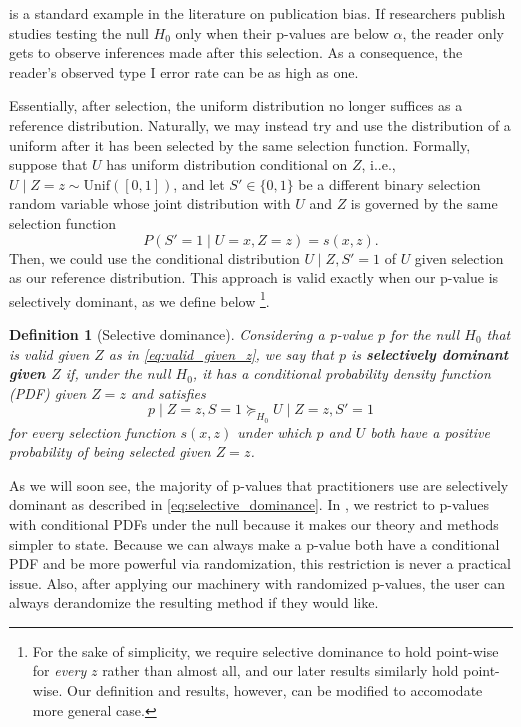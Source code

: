 \documentclass{article}
\newtheorem{definition}{Definition}
\begin{document}
 is a standard example in the literature on publication bias. If researchers publish studies testing the null $H_0$ only when their p-values are below $\alpha$, the reader only gets to observe inferences made after this selection. As a consequence, the reader's observed type I error rate can be as high as one. 

Essentially, after selection, the uniform distribution no longer suffices as a reference distribution. Naturally, we may instead try and use the distribution of a uniform after it has been selected by the same selection function. Formally, suppose that $U$ has uniform distribution conditional on $Z$, i..e., $U \mid Z=z \sim \text{Unif}([0, 1])$, and let $S' \in \{0, 1\}$ be a different binary selection random variable whose joint distribution with $U$ and $Z$ is governed by the same selection function 
\begin{equation*}
     P(S' = 1 \mid U = x, Z=z ) = s(x, z).
\end{equation*}
Then, we could use the conditional distribution $U \mid Z,  S' = 1$ of $U$ given selection as our reference distribution. This approach is valid exactly when our p-value is selectively dominant, as we define below \footnote{For the sake of simplicity, we require selective dominance to hold point-wise for \emph{every} $z$ rather than almost all, and our later results similarly hold point-wise. Our definition and results, however, can be modified to accomodate more general case.}. 

\begin{definition}[Selective dominance]
    \label{def:selective_dominance}
    Considering a p-value $p$ for the null $H_0$ that is valid given $Z$ as in \eqref{eq:valid_given_z}, we say that $p$ is \textbf{selectively dominant given $Z$} if, under the null $H_0$, it has a conditional probability density function (PDF) given $Z=z$ and satisfies
    \begin{equation}
    \label{eq:selective_dominance}
    p \mid Z=z, S = 1 \succeq_{H_0} U \mid Z=z, S' = 1
    \end{equation}
    for every selection function $s(x, z)$ under which $p$ and $U$ both have a positive probability of being selected given $Z=z$. 
\end{definition}

As we will soon see, the majority of p-values that practitioners use are selectively dominant as described in \eqref{eq:selective_dominance}. In , we restrict to p-values with conditional PDFs under the null because it makes our theory and methods simpler to state. Because we can always make a p-value both have a conditional PDF and be more powerful via randomization, this restriction is never a practical issue. Also, after applying our machinery with randomized p-values, the user can always derandomize the resulting method if they would like. %
\end{document}
